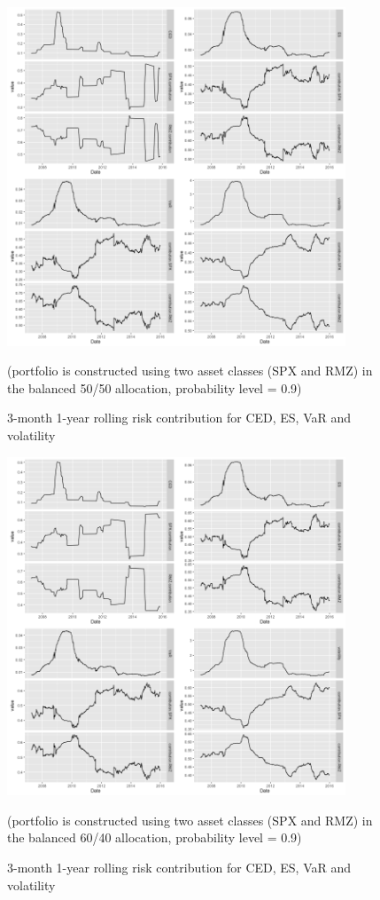 \documentclass[11pt]{article}
\begin{document}
\begin{figure}[H]
\centering
\includegraphics[width = 0.9\textwidth]{../figures/risk_contribution/SPX_RMZ_55}
\caption{3-month 1-year rolling risk contribution for CED, ES, VaR and volatility}
(portfolio is constructed using two asset classes (SPX and RMZ) in the balanced 50/50 allocation, probability level = 0.9)
\label{fig:risk_contribution_SPX_RMZ_55}
\end{figure}

\begin{figure}[H]
\centering
\includegraphics[width = 0.9\textwidth]{../figures/risk_contribution/SPX_RMZ_64}
\caption{3-month 1-year rolling risk contribution for CED, ES, VaR and volatility}
(portfolio is constructed using two asset classes (SPX and RMZ) in the balanced 60/40 allocation, probability level = 0.9)
\label{fig:risk_contribution_SPX_RMZ_64}
\end{figure}
\end{document}
